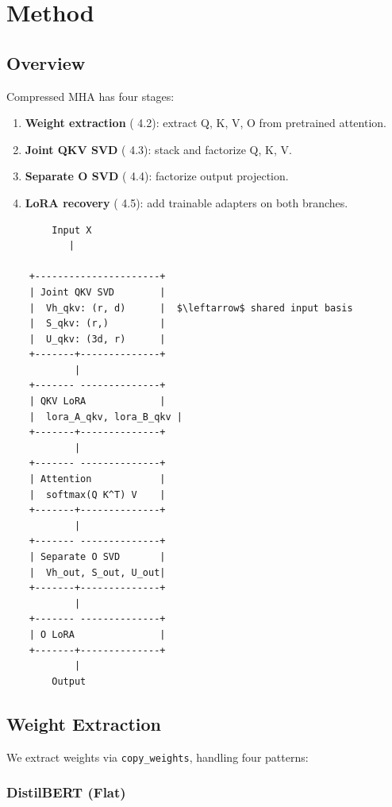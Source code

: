 \section{Method}

\subsection{Overview}

Compressed MHA has four stages:

\begin{enumerate}
\item \textbf{Weight extraction} ( 4.2): extract Q, K, V, O from pretrained attention.
\item \textbf{Joint QKV SVD} ( 4.3): stack and factorize Q, K, V.
\item \textbf{Separate O SVD} ( 4.4): factorize output projection.
\item \textbf{LoRA recovery} ( 4.5): add trainable adapters on both branches.

\end{enumerate}
\begin{lstlisting}
        Input X
           |
            
    +----------------------+
    | Joint QKV SVD        |
    |  Vh_qkv: (r, d)      |  $\leftarrow$ shared input basis
    |  S_qkv: (r,)         |
    |  U_qkv: (3d, r)      |
    +-------+--------------+
            |
    +------- --------------+
    | QKV LoRA             |
    |  lora_A_qkv, lora_B_qkv |
    +-------+--------------+
            |
    +------- --------------+
    | Attention            |
    |  softmax(Q K^T) V    |
    +-------+--------------+
            |
    +------- --------------+
    | Separate O SVD       |
    |  Vh_out, S_out, U_out|
    +-------+--------------+
            |
    +------- --------------+
    | O LoRA               |
    +-------+--------------+
            |
        Output
\end{lstlisting}

\subsection{Weight Extraction}

We extract weights via \texttt{copy\_weights}, handling four patterns:

\subsubsection{DistilBERT (Flat)}

